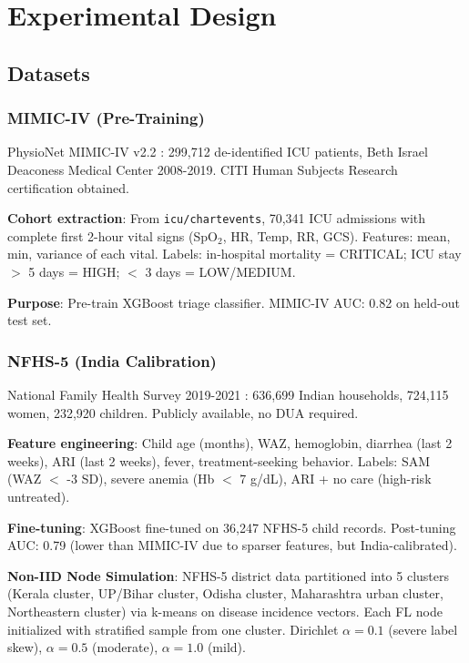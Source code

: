 \documentclass[conference,compsoc]{IEEEtran}
\begin{document}
\section{Experimental Design}

\subsection{Datasets}

\subsubsection{MIMIC-IV (Pre-Training)}
PhysioNet MIMIC-IV v2.2 \cite{mimiciv_2023}: 299,712 de-identified ICU patients, Beth Israel Deaconess Medical Center 2008-2019. CITI Human Subjects Research certification obtained.

\textbf{Cohort extraction}: From \texttt{icu/chartevents}, 70,341 ICU admissions with complete first 2-hour vital signs (SpO\(_2\), HR, Temp, RR, GCS). Features: mean, min, variance of each vital. Labels: in-hospital mortality = CRITICAL; ICU stay \(>\) 5 days = HIGH; \(<\) 3 days = LOW/MEDIUM.

\textbf{Purpose}: Pre-train XGBoost triage classifier. MIMIC-IV AUC: 0.82 on held-out test set.

\subsubsection{NFHS-5 (India Calibration)}
National Family Health Survey 2019-2021 \cite{nfhs5}: 636,699 Indian households, 724,115 women, 232,920 children. Publicly available, no DUA required.

\textbf{Feature engineering}: Child age (months), WAZ, hemoglobin, diarrhea (last 2 weeks), ARI (last 2 weeks), fever, treatment-seeking behavior. Labels: SAM (WAZ \(<\) -3 SD), severe anemia (Hb \(<\) 7 g/dL), ARI + no care (high-risk untreated).

\textbf{Fine-tuning}: XGBoost fine-tuned on 36,247 NFHS-5 child records. Post-tuning AUC: 0.79 (lower than MIMIC-IV due to sparser features, but India-calibrated).

\textbf{Non-IID Node Simulation}: NFHS-5 district data partitioned into 5 clusters (Kerala cluster, UP/Bihar cluster, Odisha cluster, Maharashtra urban cluster, Northeastern cluster) via k-means on disease incidence vectors. Each FL node initialized with stratified sample from one cluster. Dirichlet \(\alpha=0.1\) (severe label skew), \(\alpha=0.5\) (moderate), \(\alpha=1.0\) (mild).
\end{document}
